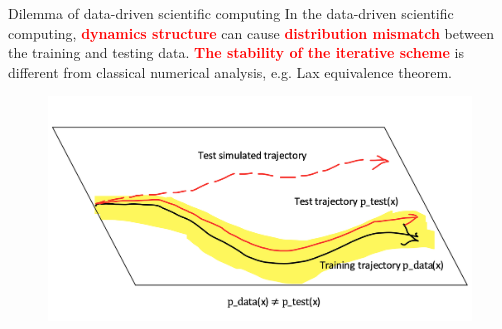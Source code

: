 \documentclass[aspectratio=169]{beamer}
\begin{document}

\begin{frame}{Dilemma of data-driven scientific computing}
	In the data-driven scientific computing, \textcolor{red}{\textbf{dynamics structure}}
	can cause \textcolor{red}{\textbf{distribution mismatch}} between the training and testing data.
	\textcolor{red}{\textbf{The stability of the iterative scheme}} is different from classical numerical analysis, e.g.
	Lax equivalence theorem.
	\begin{figure}[H]
          \centering
          \centerline{\includegraphics[width=.8\linewidth]{fig/dilemma.jpg}}
        \end{figure}
\end{frame}
\end{document}
